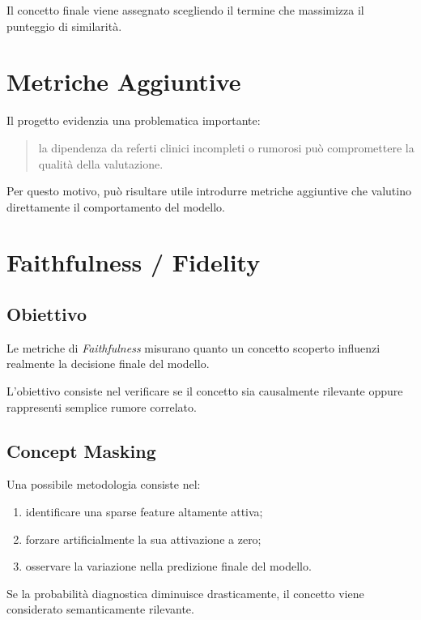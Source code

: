 Il concetto finale viene assegnato scegliendo il termine che massimizza il punteggio di similarità.

\section{Metriche Aggiuntive}

Il progetto evidenzia una problematica importante:

\begin{quote}
la dipendenza da referti clinici incompleti o rumorosi può compromettere la qualità della valutazione.
\end{quote}

Per questo motivo, può risultare utile introdurre metriche aggiuntive che valutino direttamente il comportamento del modello.

\section{Faithfulness / Fidelity}

\subsection{Obiettivo}

Le metriche di \textit{Faithfulness} misurano quanto un concetto scoperto influenzi realmente la decisione finale del modello.

L'obiettivo consiste nel verificare se il concetto sia causalmente rilevante oppure rappresenti semplice rumore correlato.

\subsection{Concept Masking}

Una possibile metodologia consiste nel:

\begin{enumerate}
    \item identificare una sparse feature altamente attiva;
    
    \item forzare artificialmente la sua attivazione a zero;
    
    \item osservare la variazione nella predizione finale del modello.
\end{enumerate}

Se la probabilità diagnostica diminuisce drasticamente, il concetto viene considerato semanticamente rilevante.

